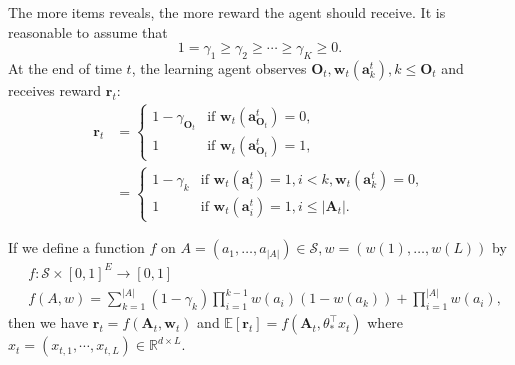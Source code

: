 \documentclass{article}
\newcommand{\EE}{\mathbb{E}}
\newcommand{\RR}{\mathbb{R}}
\newcommand{\bA}{\mathbf{A}}
\newcommand{\ba}{\mathbf{a}}
\newcommand{\bO}{\mathbf{O}}
\newcommand{\br}{\mathbf{r}}
\newcommand{\bw}{\mathbf{w}}
\newcommand{\cS}{\mathcal{S}}
\newcommand{\abs}[1]{\left| #1 \right|}
\begin{document}
The more items reveals, the more reward the agent should receive. It is reasonable to assume that
$$
1 = \gamma_1 \geq \gamma_2 \geq \cdots \geq \gamma_K \geq 0.
$$
At the end of time $t$, the learning agent observes $\bO_{t}, \bw_t(\ba_k^t), k \leq \bO_{t}$ and receives reward $\br_{t}$:
\begin{align*}
	\br_{t} &= \begin{cases}
		1 - \gamma_{\bO_{t}}  &\text{if } \bw_t(\ba_{\bO_{t}}^t) = 0,\\
		1 &\text{if } \bw_t(\ba_{\bO_{t}}^t) = 1,
	\end{cases}\\
	&=\begin{cases}
		1-\gamma_{k}  &\text{if } \bw_t(\ba_{i}^t) = 1, i < k, \bw_t(\ba_{k}^t) = 0,\\
		1 &\text{if } \bw_t(\ba_{i}^t) = 1, i\leq \abs{\bA_t}.
	\end{cases}
\end{align*}

If we define a function $f$ on $A = (a_1, \ldots, a_{\abs{A}}) \in \cS, w = (w(1), \ldots, w(L))$ by
\begin{align}
	&f: \cS \times [0,1]^E \to [0,1] \nonumber \\
	&f(A,w) = \sum_{k = 1}^{\abs{A}} (1 - \gamma_k) \prod_{i = 1}^{k - 1} w(a_i)(1 - w(a_k)) + \prod_{i=1}^{\abs{A}}w(a_i),
\label{eq:AndRewardFunc}
\end{align}
then we have $\br_{t} = f(\bA_t, \bw_t)$ and $\EE[\br_{t}] = f(\bA_t, \theta_{\ast}^{\top}x_t)$ where $x_t = (x_{t,1}, \cdots, x_{t,L}) \in \RR^{d \times L}$. 
\end{document}
